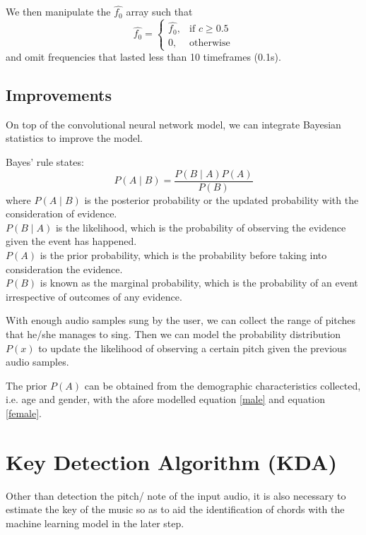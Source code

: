 We then manipulate the $\hat{f_0}$ array such that
\[\hat{f_0}= 
\begin{cases}
    \hat{f_0},		& \text{if } c\geq 0.5\\
    0,              & \text{otherwise}
\end{cases}
\label{creperesult}
\]
and omit frequencies that lasted less than 10 timeframes (0.1s).
\subsection{Improvements}

On top of the convolutional neural network model, we can integrate Bayesian statistics to improve the model.

Bayes' rule states: 
\[P(A\mid B)=\frac {P(B\mid A)P(A)}{P(B)}\]
where $P(A\mid B)$ is the posterior probability or the updated probability with the consideration of evidence.\\
$P(B\mid A)$ is the likelihood, which is the probability of observing the evidence given the event has happened.\\
$P(A)$ is the prior probability, which is the probability before taking into consideration the evidence.\\
$P(B)$ is known as the marginal probability, which is the probability of an event irrespective of outcomes of any evidence.

With enough audio samples sung by the user, we can collect the range of pitches that he/she manages to sing. Then we can model 
the probability distribution $P(x)$ to update the likelihood of observing a certain pitch given the previous audio samples.

The prior $P(A)$ can be obtained from the demographic characteristics collected, i.e. age and gender, with the afore modelled equation
\ref{male} and equation \ref{female}.

\section{Key Detection Algorithm (KDA)}
\label{sec:KDA}
Other than detection the pitch/ note of the input audio, it is also necessary to estimate the key of the music so as to aid the identification
of chords with the machine learning model in the later step.


